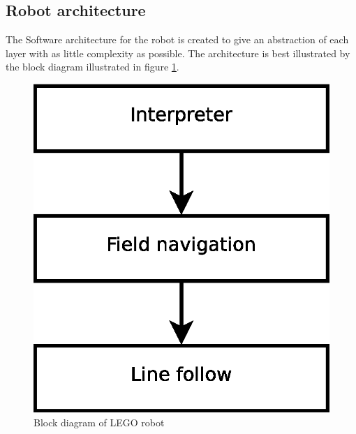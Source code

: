 \documentclass[draft, english, a4paper]{article}
\begin{document}
	\subsection{Robot architecture}
	    The Software architecture for the robot is created to give an abstraction
	    of each layer with as little complexity as possible. The architecture
	    is best illustrated by the block diagram illustrated in figure \ref{fig:robotBlockDiagram}.
	    \begin{figure}[htp]
            \centering
    	    \includegraphics[scale=0.45]{robotBlockdiagram}
	        \caption{Block diagram of LEGO robot}\label{fig:robotBlockDiagram}
        \end{figure}
\end{document}
